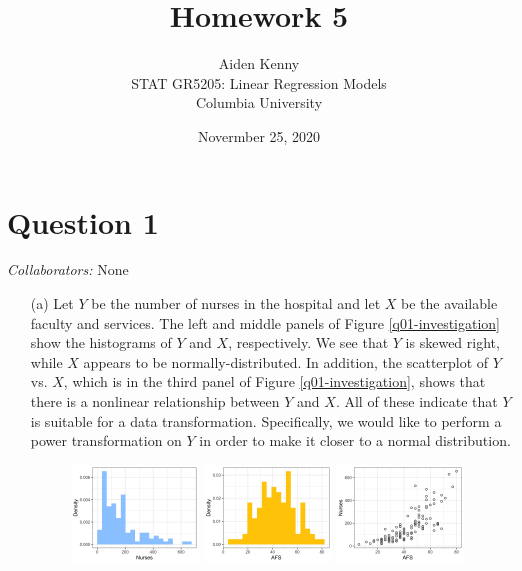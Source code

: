 \documentclass[10pt]{article}
\title{
    {\Large Homework 5}
}
\author{
    {\normalsize Aiden Kenny}\\
    {\normalsize STAT GR5205: Linear Regression Models}\\
    {\normalsize Columbia University}
}
\date{\normalsize Novermber 25, 2020}
\newcommand{\mycolaba}[1]{\textcolor{colabcol}{\textsl{Collaborators:}} #1}
\begin{document}
\maketitle

\newcommand{\myf}{\mathbf{f}_{\lambda}}
\newcommand{\myffull}{\mathbf{f}_{\lambda}(\mathbf{y})}
\newcommand{\myg}{\mathbf{g}_{\lambda}}
\newcommand{\mygfull}{\mathbf{g}_{\lambda}(\mathbf{y})}
\section{Question 1} \noindent
\mycolaba{None}
\begin{itemize}
    \item[(a)] Let \(Y\) be the number of nurses in the hospital and let \(X\) be the available faculty and services. 
    The left and middle panels of Figure \ref{q01-investigation} show the histograms of \(Y\) and \(X\), respectively. We see that \(Y\) is skewed right, while 
    \(X\) appears to be normally-distributed. In addition, the scatterplot of \(Y\) vs. \(X\), which is in the third panel of Figure 
    \ref{q01-investigation}, shows that there is a nonlinear relationship between \(Y\) and \(X\). 
    All of these indicate that \(Y\) is suitable for a data transformation. Specifically, we would like to perform a 
    power transformation on \(Y\) in order to make it closer to a normal distribution. 
    \begin{figure}[ht]
        \centering
        \includegraphics[width = 0.32\textwidth]{img/q01-nurses-hist-original.png}
        \includegraphics[width = 0.32\textwidth]{img/q01-afs-hist-original.png}
        \includegraphics[width = 0.32\textwidth]{img/q01-scatterplot-blank.png}

\end{figure}
\end{itemize}
\end{document}
